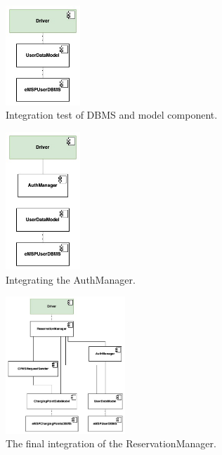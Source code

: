 \documentclass{Configuration_Files/PoliMi3i_thesis}
\begin{document}
\begin{figure}[H]
    \centering
    \includegraphics[width=0.25\textwidth]{Images/test/Thread example/5.jpg}
    \caption{Integration test of DBMS and model component.}
\end{figure}

\begin{figure}[H]
    \centering
    \includegraphics[width=0.25\textwidth]{Images/test/Thread example/6.jpg}
    \caption{Integrating the AuthManager.}
\end{figure}

\begin{figure}[H]
    \centering
    \includegraphics[width=0.4\textwidth]{Images/test/Thread example/7.jpg}
    \caption{The final integration of the ReservationManager.}
\end{figure}
\end{document}

